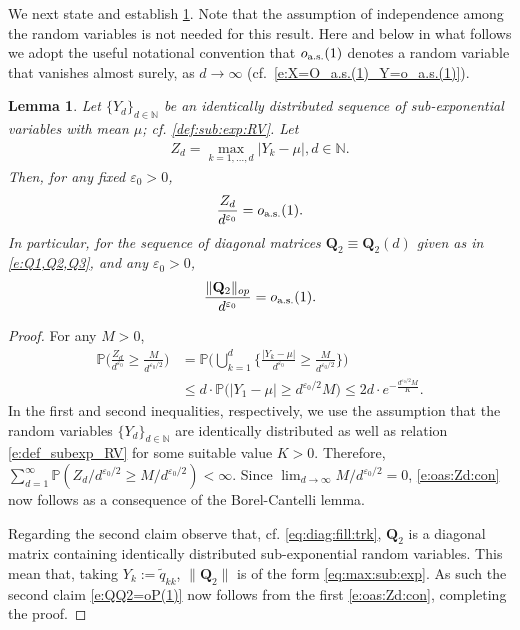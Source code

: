 \documentclass[9pt,twocolumn,twoside]{pnas-new}
\newcommand{\bbN}{{\mathbb N}}
\newcommand{\bbP}{{\mathbb P}}
\newcommand{\?}{\textbf{?}}
\newcommand{\as}{\textnormal{a.s.}}
\newcommand{\QQ}{\mathbf{Q}}
\newtheorem{lemma}{\bf Lemma}
\begin{document}
We next state and establish \cref{l:max_Yn/n^eps}. Note that the
assumption of independence among the random variables is not needed
for this result.  Here and below in what follows we adopt the useful
notational convention that $o_{\textnormal{a.s.}}(1)$ denotes a random
variable that vanishes almost surely, as $d\to \infty$ (cf.\
\eqref{e:X=O_a.s.(1)_Y=o_a.s.(1)}).
\begin{lemma}\label{l:max_Yn/n^eps}
  Let $\{Y_{d}\}_{d \in \bbN}$ be an identically distributed sequence
  of sub-exponential variables with mean $\mu$;
  cf. \cref{def:sub:exp:RV}. Let
  \begin{align}
    Z_{d} = \max_{k=1,\hdots,d} |Y_k - \mu|, d \in \bbN.
    \label{eq:max:sub:exp}
  \end{align} 
  Then, for any fixed $\varepsilon_0 > 0$, 
  \begin{align}\label{e:oas:Zd:con}
   \frac{Z_d}{d^{\varepsilon_0}} = o_{\as}(1).
  \end{align}
   In particular, for the sequence of diagonal matrices
   $\QQ_2 \equiv \QQ_2(d)$ given as in \eqref{e:Q1,Q2,Q3}, and any
   $\varepsilon_0 > 0$,
\begin{align}
  \frac{\|\QQ_2\|_{op}}{d^{\varepsilon_0}} = o_{\as}(1).
  \label{e:QQ2=oP(1)}
\end{align}
\end{lemma}
\begin{proof}
For any $M > 0$,
\begin{align*}
  \bbP\Big(\frac{Z_d}{d^{\varepsilon_0}} \geq \frac{M}{d^{\varepsilon_0/2}}\Big)
  &= \bbP\Big(\bigcup^{d}_{k=1}\Big\{\frac{|Y_k - \mu|}{d^{\varepsilon_0}}
  \geq \frac{M}{d^{\varepsilon_0/2}}\Big\}\Big) \\
  &\leq d \cdot\bbP\big(|Y_1 - \mu| \geq d^{\varepsilon_0/2}M\big) 
 \leq  2d\cdot e^{- \frac{d^{\varepsilon_0/2}M}{K}}.
\end{align*}
In the first and second inequalities, respectively, we use the
assumption that the random variables $\{Y_{d}\}_{d \in \bbN}$ are
identically distributed as well as relation \eqref{e:def_subexp_RV}
for some suitable value $K > 0$. Therefore,
$\sum^{\infty}_{d=1}\bbP(Z_d/d^{\varepsilon_0/2} \geq
M/d^{\varepsilon_0/2})< \infty.$ Since
$\lim_{d \rightarrow \infty}M/d^{\varepsilon_0/2} = 0$,
\eqref{e:oas:Zd:con} now follows as a consequence of the
Borel-Cantelli lemma.

Regarding the second claim observe that, cf. \eqref{eq:diag:fill:trk},
$\QQ_2$ is a diagonal matrix containing identically distributed
sub-exponential random variables.  This mean that, taking
$Y_k :=\tilde{q}_{kk}$, $\|\QQ_2\|$ is of the form
\eqref{eq:max:sub:exp}. As such the second claim \eqref{e:QQ2=oP(1)}
now follows from the first \eqref{e:oas:Zd:con}, completing the proof.
\end{proof}
\end{document}
